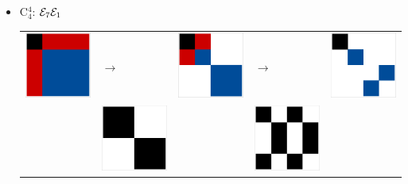 \begin{itemize}
\begin{itemize}
\item C$_4^4$: $\mathcal{E}_7\mathcal{E}_1$\newline
\begin{tabular}{m{2cm} m{2cm} m{2cm} m{2cm} m{2cm}}
\includegraphics[width=2.2cm]{img-JA/id}  
& \hspace{0.8cm}$\longrightarrow$ 
& \includegraphics[width=2.2cm]{img-JA/8comp} 
& \hspace{0.8cm}$\longrightarrow$ 
& \includegraphics[width=2.2cm]{img-JA/4comp}\\ 
 & \includegraphics[width=2.2cm]{img-JA/16To8} &  
 & \includegraphics[width=2.2cm]{img-JA/8To4} &\\ 
\end{tabular} 
\end{itemize}



\end{itemize}
